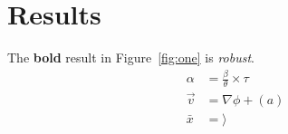 
\section{Results}
\noindent The \textbf{bold} result in Figure~\ref{fig:one} is \emph{robust}.
\begin{align}
  \alpha &= \frac{\beta}{\theta} \times \tau \\
  \vec{v} &= \nabla \phi + \left( a \right) \\
  \bar{x} &= \rangle
\end{align}
\newline

